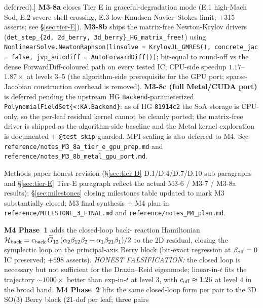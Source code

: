 \documentclass[11pt]{article}
\begin{document}
\begin{description}
deferred).] \textbf{M3-8a} closes Tier E in graceful-degradation
mode (E.1 high-Mach Sod, E.2 severe shell-crossing, E.3 low-Knudsen
Navier--Stokes limit; +315 asserts; see \S\ref{sec:tier-E}).
\textbf{M3-8b} ships the matrix-free Newton-Krylov drivers
(\texttt{det\_step\_\{2d, 2d\_berry, 3d\_berry\}\_HG\_matrix\_free!})
using \texttt{NonlinearSolve.NewtonRaphson(linsolve =
KrylovJL\_GMRES(), concrete\_jac = false, jvp\_autodiff =
AutoForwardDiff())}; bit-equal to round-off vs the dense
ForwardDiff-coloured path on every tested IC; CPU-side speedup
$1.17$--$1.87\times$ at levels $3$--$5$ (the algorithm-side
prerequisite for the GPU port; sparse-Jacobian construction
overhead is removed). \textbf{M3-8c (full Metal/CUDA port)} is
deferred pending the upstream HG \texttt{Backend}-parameterized
\texttt{PolynomialFieldSet\{<:KA.Backend\}}: as of HG \texttt{81914c2}
the SoA storage is CPU-only, so the per-leaf residual kernel cannot
be cleanly ported; the matrix-free driver is shipped as the
algorithm-side baseline and the Metal kernel exploration is
documented + \texttt{@test\_skip}-guarded. MPI scaling is also
deferred to M4. See
\verb|reference/notes_M3_8a_tier_e_gpu_prep.md| and
\verb|reference/notes_M3_8b_metal_gpu_port.md|.
\item[Milestone 3-9 --- Wrap-up (DONE).] Methods-paper honest
revision (\S\ref{sec:tier-D} D.1/D.4/D.7/D.10 sub-paragraphs and
\S\ref{sec:tier-E} Tier-E paragraph reflect the actual M3-6 / M3-7
/ M3-8a results); \S\ref{sec:milestones} closing milestones table
updated to mark M3 substantially closed; M3 final synthesis +
M4 plan in
\verb|reference/MILESTONE_3_FINAL.md| and
\verb|reference/notes_M4_plan.md|.
\item[Milestone 4 --- Physics-extension substrates + closed-loop
falsifiers (DONE; sub-phases 1--3, with full GPU/MPI/E.4/D.6/D.8/D.9
deferred to M5).] \textbf{M4 Phase~1} adds the closed-loop back-
reaction Hamiltonian $\mathcal H_{\rm back} = c_{\rm back}\,\widetilde
G_{12}\,(\alpha_2\beta_{12}\beta_2 + \alpha_1\beta_{21}\beta_1)/2$
to the 2D residual, closing the symplectic loop on the principal-axis
Berry block (bit-exact regression at $\beta_{\rm off} = 0$ IC
preserved; $+598$ asserts). \emph{HONEST FALSIFICATION:} the closed
loop is necessary but not sufficient for the Drazin--Reid eigenmode;
linear-in-$t$ fits the trajectory $\sim 1000\times$ better than
exp-in-$t$ at level 3, with $c_{\rm off} \approx 1.26$ at level $4$
in the broad band. \textbf{M4 Phase~2} lifts the same closed-loop form
per pair to the 3D SO(3) Berry block ($21$-dof per leaf; three pairs

\end{description}
\end{document}
